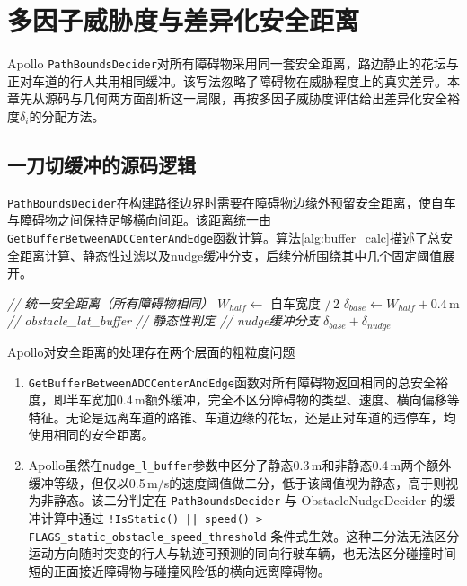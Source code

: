\chapter{多因子威胁度与差异化安全距离}
\label{chap:threat}

Apollo \texttt{PathBoundsDecider}对所有障碍物采用同一套安全距离，路边静止的花坛与正对车道的行人共用相同缓冲。该写法忽略了障碍物在威胁程度上的真实差异。本章先从源码与几何两方面剖析这一局限，再按多因子威胁度评估给出差异化安全裕度$\delta_i$的分配方法。

\section{一刀切缓冲的源码逻辑}
\label{sec:problem_margin}

\texttt{PathBoundsDecider}在构建路径边界时需要在障碍物边缘外预留安全距离，使自车与障碍物之间保持足够横向间距。该距离统一由\texttt{GetBuffer\-Between\-ADCCenter\-AndEdge}函数计算。算法\ref{alg:buffer_calc}描述了总安全距离计算、静态性过滤以及nudge缓冲分支，后续分析围绕其中几个固定阈值展开。

\begin{algorithm}[htbp]
\caption{安全距离统一计算与nudge缓冲的静态/非静态分支}
\label{alg:buffer_calc}
\textcolor{gray!30!black}{\textit{// 统一安全距离（所有障碍物相同）}}\;
$W_{half} \leftarrow$ 自车宽度 $/\, 2$ \;
$\delta_{base} \leftarrow W_{half} + 0.4$\,m \textcolor{gray!30!black}{\textit{// obstacle\_lat\_buffer}}\;
\textcolor{gray!30!black}{\textit{// 静态性判定}}\;
\textcolor{gray!30!black}{\textit{// nudge缓冲分支}}\;
\KwRet $\delta_{base} + \delta_{nudge}$ \;
\end{algorithm}

Apollo对安全距离的处理存在两个层面的粗粒度问题
\begin{enumerate}
\item \texttt{GetBufferBetweenADCCenterAndEdge}函数对所有障碍物返回相同的总安全裕度，即半车宽加0.4\,m额外缓冲，完全不区分障碍物的类型、速度、横向偏移等特征。无论是远离车道的路锥、车道边缘的花坛，还是正对车道的违停车，均使用相同的安全距离。

\item Apollo虽然在\texttt{nudge\_l\_buffer}参数中区分了静态0.3\,m和非静态0.4\,m两个额外缓冲等级，但仅以0.5\,m/s的速度阈值做二分，低于该阈值视为静态，高于则视为非静态。该二分判定在 \texttt{PathBoundsDecider} 与 ObstacleNudgeDecider 的缓冲计算中通过 \texttt{!IsStatic() || speed() > FLAGS\_static\_obstacle\_speed\_threshold} 条件式生效。这种二分法无法区分运动方向随时突变的行人与轨迹可预测的同向行驶车辆，也无法区分碰撞时间短的正面接近障碍物与碰撞风险低的横向远离障碍物。
\end{enumerate}

